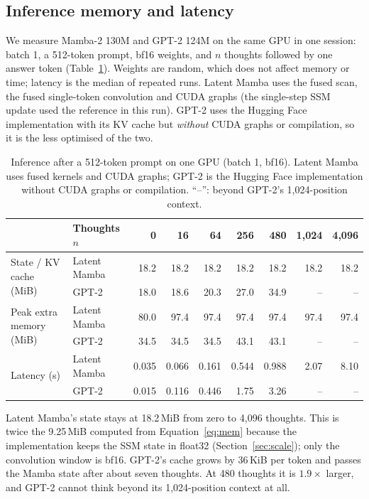 \documentclass[10pt]{article}
\makeatletter
\renewcommand\paragraph{\@startsection{paragraph}{4}{\z@}{0.01em}{-1em}{\normalfont\normalsize\bfseries}}
\makeatother
\begin{document}
\subsection{Inference memory and latency}
\label{sec:bench}

We measure Mamba-2 130M and GPT-2 124M on the same GPU in one session: batch 1, a 512-token prompt, bf16 weights, and $n$ thoughts followed by one answer token (Table~\ref{tab:bench}). Weights are random, which does not affect memory or time; latency is the median of repeated runs. Latent Mamba uses the fused scan, the fused single-token convolution and CUDA graphs (the single-step SSM update used the reference in this run). GPT-2 uses the Hugging Face implementation with its KV cache but \emph{without} CUDA graphs or compilation, so it is the less optimised of the two.

\begin{table}[t]
\centering
\small
\begin{tabular}{@{}llrrrrrrr@{}}
\toprule
& Thoughts $n$ & 0 & 16 & 64 & 256 & 480 & 1{,}024 & 4{,}096 \\
\midrule
\multirow{2}{*}{State / KV cache (MiB)} & Latent Mamba & 18.2 & 18.2 & 18.2 & 18.2 & 18.2 & 18.2 & 18.2 \\
& GPT-2 & 18.0 & 18.6 & 20.3 & 27.0 & 34.9 & -- & -- \\
\midrule
\multirow{2}{*}{Peak extra memory (MiB)} & Latent Mamba & 80.0 & 97.4 & 97.4 & 97.4 & 97.4 & 97.4 & 97.4 \\
& GPT-2 & 34.5 & 34.5 & 34.5 & 43.1 & 43.1 & -- & -- \\
\midrule
\multirow{2}{*}{Latency (s)} & Latent Mamba & 0.035 & 0.066 & 0.161 & 0.544 & 0.988 & 2.07 & 8.10 \\
& GPT-2 & 0.015 & 0.116 & 0.446 & 1.75 & 3.26 & -- & -- \\
\bottomrule
\end{tabular}
\caption{Inference after a 512-token prompt on one GPU (batch 1, bf16). Latent Mamba uses fused kernels and CUDA graphs; GPT-2 is the Hugging Face implementation without CUDA graphs or compilation. ``--'': beyond GPT-2's 1{,}024-position context.}
\label{tab:bench}
\end{table}

\paragraph{The state is constant.} Latent Mamba's state stays at 18.2\,MiB from zero to 4{,}096 thoughts. This is twice the 9.25\,MiB computed from Equation~\eqref{eq:mem} because the implementation keeps the SSM state in float32 (Section~\ref{sec:scale}); only the convolution window is bf16. GPT-2's cache grows by 36\,KiB per token and passes the Mamba state after about seven thoughts. At 480 thoughts it is $1.9\times$ larger, and GPT-2 cannot think beyond its 1{,}024-position context at all.
\end{document}
